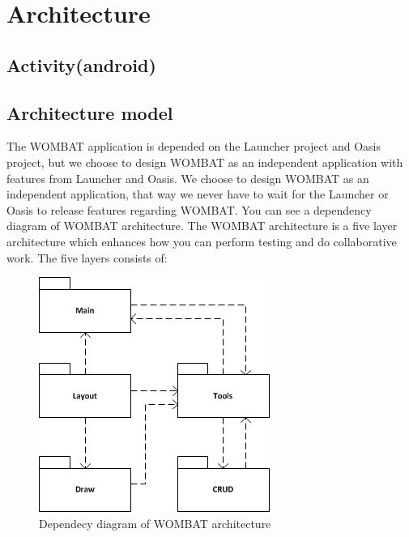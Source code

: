 \section{Architecture}
\label{sec:Architecture}
\subsection{Activity(android)}

\subsection{Architecture model}
The WOMBAT application is depended on the Launcher project and Oasis project, but we choose to design WOMBAT as an independent application with features from Launcher and Oasis.
We choose to design WOMBAT as an independent application, that way we never have to wait for the Launcher or Oasis to release features regarding WOMBAT. You can see a dependency diagram of WOMBAT architecture. The WOMBAT architecture is a five layer architecture which enhances how you can perform testing and do collaborative work. The five layers consists of: 

\begin{figure}[H]
	\centering
		\includegraphics[scale=0.6]{Images/Implementation/WombatDependency.png}
	\caption{Dependecy diagram of WOMBAT architecture}
	\label{fig:WombatDependency}
\end{figure}


